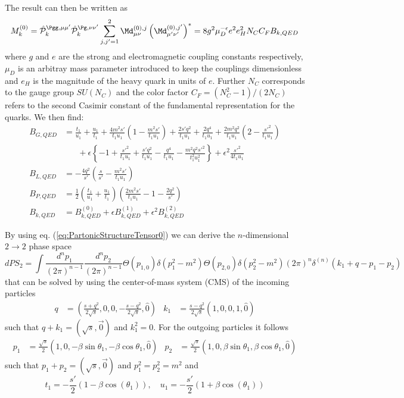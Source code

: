 The result can then be written as
\begin{equation}
M_k^{(0)} = \hat {\mathcal P}_{k}^{\Pgg,\mu\mu'}\hat {\mathcal P}_{k}^{\Pg,\nu\nu'}\sum_{j,j'=1}^2\Md^{(0),j}_{\mu\nu}\left(\Md^{(0),j'}_{\mu'\nu'}\right)^* = 8g^2\mu_D^{-\epsilon}e^2e_H^2 N_C C_F B_{k,QED}
\end{equation}
where $g$ and $e$ are the strong and electromagnetic coupling constants respectively, $\mu_D$ is an arbitray mass parameter introduced to keep the couplings dimensionless and $e_H$ is the magnitude of the heavy quark in units of $e$. Further $N_C$ corresponds to the gauge group $SU(N_C)$ and the color factor $C_F=(N_C^2-1)/(2N_C)$ refers to the second Casimir constant of the fundamental representation for the quarks. We then find:
\begin{align}
B_{G,QED} &= \frac{t_1}{u_1} + \frac{u_1}{t_1} + \frac{4m^2s'}{t_1u_1}\left(1-\frac{m^2s'}{t_1u_1}\right)
+\frac{2s'q^2}{t_1u_1} +\frac{2q^4}{t_1u_1} + \frac{2m^2q^2}{t_1u_1}\left(2-\frac{{s'}^2}{t_1u_1}\right)\nonumber\\
 &\hspace{20pt}+\epsilon\left\{ -1 + \frac{{s'}^2}{t_1u_1} + \frac{s'q^2}{t_1u_1} -
\frac{q^4}{t_1u_1} - \frac{m^2q^2{s'}^2}{t_1^2u_1^2} \right\} + \epsilon^2\frac{{s'}^2}{4t_1u_1}\\
B_{L,QED} &= -\frac{4q^2}{s'}\left(\frac s {s'} - \frac{m^2s'}{t_1u_1}\right)\\
B_{P,QED} &= \frac 1 2\left(\frac{t_1}{u_1}+\frac{u_1}{t_1}\right)\left(\frac{2m^2 s'}{t_1u_1}-1 - \frac{2q^2}{s'}\right)\\
B_{k,QED} &= B^{(0)}_{k,QED} + \epsilon B^{(1)}_{k,QED} + \epsilon^2 B^{(2)}_{k,QED}
\end{align}

By using eq. (\ref{eq:PartonicStructureTensor0}) we can derive the $n$-dimensional $2\rightarrow 2$ phase space
\begin{equation}
dPS_2 = \!\int\!\!\frac{d^{n}p_1}{(2\pi)^{n-1}}\frac{d^{n}p_2}{(2\pi)^{n-1}}\Theta(p_{1,0})\delta(p_1^2-m^2)\Theta(p_{2,0})\delta(p_2^2-m^2)(2\pi)^n\delta^{(n)}(k_1+q-p_1-p_2)
\end{equation}
that can be solved by using the center-of-mass system (CMS) of the incoming particles\cite{Bojak:2000eu}
\begin{align}
q &= \left(\frac {s+q^2}{2\sqrt s},0,0,-\frac{s-q^2}{2\sqrt s},\hat 0\right) &
k_1 &= \frac {s-q^2}{2\sqrt s}\left(1,0,0,1,\hat 0\right)
\end{align}
such that $q+k_1=(\sqrt s,\vec 0)$ and $k_1^2 = 0$. For the outgoing particles it follows
\begin{align}
p_1 &= \frac{\sqrt s} 2 \left(1,0,-\beta\sin\theta_1,-\beta\cos\theta_1,\hat 0\right)&
p_2 &= \frac{\sqrt s} 2 \left(1,0,\beta\sin\theta_1,\beta\cos\theta_1,\hat 0\right)
\end{align}
such that $p_1+p_2 = (\sqrt s,\vec 0)$ and $p_1^2 = p_2^2=m^2$ and 
\begin{equation}t_1 = -\frac{s'}{2}(1-\beta \cos(\theta_1)), \quad u_1=-\frac{s'}{2}(1+\beta \cos(\theta_1))\end{equation}

